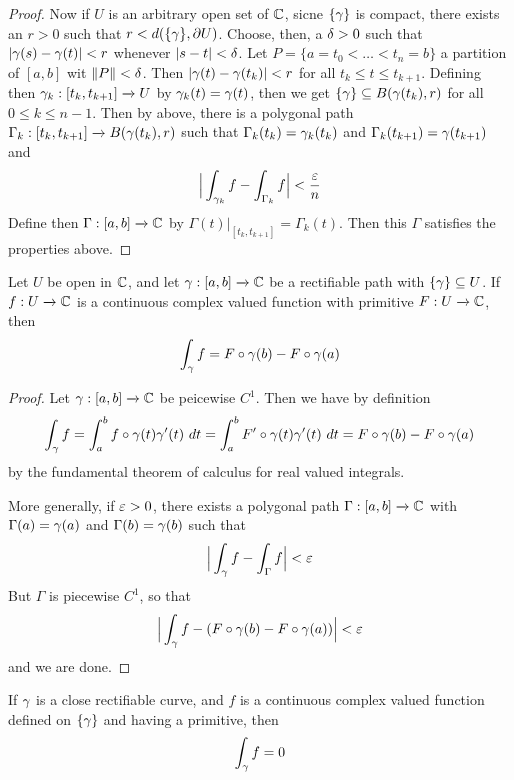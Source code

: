 \begin{proof}
    Now if $U$ is an arbitrary open set of  $\mathbb{C}$, sicne  $\{\gamma\}$ is compact,
    there exists an $r>0$ such that $r<d(\{\gamma\},\partial{U})$. Choose, then, a
    $\delta>0$ such that  $|\gamma(s)-\gamma(t)|<r$ whenever $|s-t|<\delta$. Let
    $P=\{a=t_0<\dots<t_n=b\}$ a partition of $[a,b]$ wit $\|P\|<\delta$. Then
    $|\gamma(t)-\gamma(t_k)|<r$ for all $t_k \leq t \leq t_{k+1}$. Defining then
    $\gamma_k:[t_k,t_{k+1}] \xrightarrow{} U$ by $\gamma_k(t)=\gamma(t)$, then we get
    $\{\gamma\} \subseteq B(\gamma(t_k),r)$ for all $0 \leq k \leq n-1$. Then by above,
    there is a polygonal path $\Gamma_k:[t_k,t_{k+1}] \xrightarrow{}
    B(\gamma(t_k),r)$ such that $\Gamma_k(t_k)=\gamma_k(t_k)$ and
    $\Gamma_k(t_{k+1})=\gamma(t_{k+1})$ and
    \begin{equation*}
        \Big{|} \int_{\gamma_k}{f}-\int_{\Gamma_k}{f} \Big{|}<\frac{\varepsilon}{n}
    \end{equation*}
    Define then $\Gamma:[a,b] \xrightarrow{} \mathbb{C}$ by
    $\Gamma(t)|_{[t_k,t_{k+1}]}=\Gamma_k(t)$. Then this $\Gamma$ satisfies the
    properties above.
\end{proof}

\begin{theorem}\label{4.2.5}
    Let $U$ be open in $\mathbb{C}$, and let $\gamma:[a,b] \xrightarrow{} \mathbb{C}$ be a
    rectifiable path with $\{\gamma\} \subseteq U$. If $f:U \xrightarrow{} \mathbb{C}$ is a
    continuous complex valued function with primitive $F:U \xrightarrow{} \mathbb{C}$,
    then
    \begin{equation*}
        \int_\gamma{f}=F \circ \gamma(b)-F \circ \gamma(a)
    \end{equation*}
\end{theorem}
\begin{proof}
    Let $\gamma:[a,b] \xrightarrow{} \mathbb{C}$ be peicewise $C^1$. Then we have by
    definition
    \begin{equation*}
        \int_\gamma{f}=\int_a^b{f \circ \gamma(t)\gamma'(t) \ dt}=
        \int_a^b{F' \circ \gamma(t)\gamma'(t) \ dt}=F \circ \gamma(b)-F \circ \gamma(a)
    \end{equation*}
    by the fundamental theorem of calculus for real valued integrals.

    More generally, if $\varepsilon>0$, there exists a polygonal path  $\Gamma:[a,b]
    \xrightarrow{} \mathbb{C}$ with $\Gamma(a)=\gamma(a)$ and $\Gamma(b)=\gamma(b)$ such that
    \begin{equation*}
        \Big{|} \int_\gamma{f}-\int_\Gamma{f} \Big{|}<\varepsilon
    \end{equation*}
    But $\Gamma$ is piecewise  $C^1$, so that
    \begin{equation*}
        \Big{|} \int_\gamma{f}-(F \circ \gamma(b)-F \circ \gamma(a)) \Big{|}<\varepsilon
    \end{equation*}
    and we are done.
\end{proof}
\begin{corollary}
    If $\gamma$ is a close rectifiable curve, and $f$ is a continuous complex valued
    function defined on $\{\gamma\}$ and having a primitive, then
    \begin{equation*}
        \int_\gamma{f}=0
    \end{equation*}
\end{corollary}

